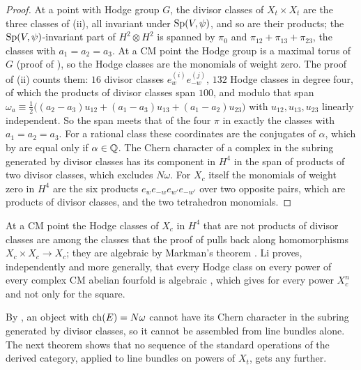 \begin{proof}
At a point with Hodge group $G$, the divisor classes of $X_{t}\times X_{t}$ are
the three classes of (ii), all invariant under
$\operatorname{Sp}(V,\psi)$, and so are their products; the $\operatorname{Sp}(V,\psi)$-invariant part of
$H^{2}\otimes H^{2}$ is spanned by $\pi_{0}$ and $\pi_{12}+\pi_{13}+\pi_{23}$,
the classes with $a_{1}=a_{2}=a_{3}$. At a CM point the Hodge group is a
maximal torus of $G$ (proof of ), so the Hodge classes
are the monomials of weight zero. The proof of (ii)
counts them: $16$ divisor classes $e^{(i)}_{w}e^{(j)}_{-w}$, $132$ Hodge
classes in degree four, of which the products of divisor classes span $100$,
and modulo that span
$\omega_{a}\equiv\frac12\bigl((a_{2}-a_{3})u_{12}+(a_{1}-a_{3})u_{13}
+(a_{1}-a_{2})u_{23}\bigr)$ with $u_{12},u_{13},u_{23}$ linearly independent.
So the span meets that of the four $\pi$ in exactly the classes with
$a_{1}=a_{2}=a_{3}$. For a rational class these
coordinates are the conjugates of $\alpha$, which by  are
equal only if $\alpha\in\mathbb{Q}$. The Chern character of a complex in the subring
generated by divisor classes has its component in $H^{4}$ in the span of
products of two divisor classes, which excludes $N\omega$. For $X_{c}$ itself
the monomials of weight zero in $H^{4}$ are the six products
$e_{w}e_{-w}e_{w'}e_{-w'}$ over two opposite pairs, which are products of
divisor classes, and the two tetrahedron monomials.
\end{proof}

At a CM point the Hodge classes of $X_{c}$ in $H^{4}$ that are not products
of divisor classes are among the classes that the proof of
 pulls back along homomorphisms $X_{c}\times X_{c}\to
X_{c}$; they are algebraic by Markman's theorem \cite{Mar25a}. Li proves,
independently and more generally, that every Hodge class on every power of
every complex CM abelian fourfold is algebraic \cite[Theorem~1.3]{Li26}, which
gives  for every power $X_{c}^{n}$ and not only for the
square.

By , an object with $\operatorname{ch}(E)=N\omega$ cannot have
its Chern character in the subring generated by divisor classes, so it cannot
be assembled from line bundles alone. The next theorem shows that no sequence
of the standard operations of the derived category, applied to line bundles
on powers of $X_{t}$, gets any further.

